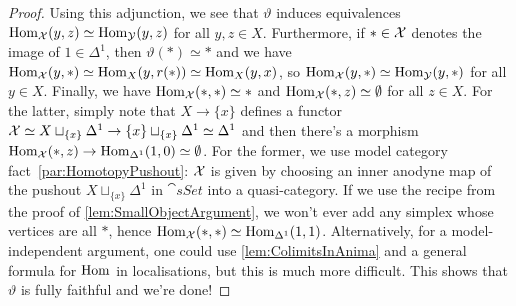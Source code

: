 \begin{proof}
	Using this adjunction, we see that $\vartheta$ induces equivalences $\operatorname{Hom}_{\mathcal{X}}(y,z)\simeq \operatorname{Hom}_{\mathcal{Y}}(y,z)$ for all $y,z\in X$. Furthermore, if $*\in \mathcal{X}$ denotes the image of $1\in \Delta^1$, then $\vartheta(*)\simeq *$ and we have $\operatorname{Hom}_{\mathcal{X}}(y,*)\simeq \operatorname{Hom}_X(y,r(*))\simeq \operatorname{Hom}_X(y,x)$, so $\operatorname{Hom}_{\mathcal{X}}(y,*)\simeq \operatorname{Hom}_{\mathcal{Y}}(y,*)$ for all $y\in X$. Finally, we have $\operatorname{Hom}_{\mathcal{X}}(*,*)\simeq *$ and $\operatorname{Hom}_{\mathcal{X}}(*,z)\simeq \emptyset$ for all $z\in X$. For the latter, simply note that $X\rightarrow\{x\}$ defines a functor $\mathcal{X}\simeq X\sqcup_{\{x\}}\Delta^1\rightarrow \{x\}\sqcup_{\{x\}}\Delta^1\simeq \Delta^1$ and then there's a morphism $\operatorname{Hom}_{\mathcal{X}}(*,z)\rightarrow \operatorname{Hom}_{\Delta^1}(1,0)\simeq \emptyset$. For the former, we use model category fact~\cref{par:HomotopyPushout}: $\mathcal{X}$ is given by choosing an inner anodyne map of the pushout $X\sqcup_{\{x\}}\Delta^1$ in $\cat{sSet}$ into a quasi-category. If we use the recipe from the proof of \cref{lem:SmallObjectArgument}, we won't ever add any simplex whose vertices are all $*$, hence $\operatorname{Hom}_{\mathcal{X}}(*,*)\simeq \operatorname{Hom}_{\Delta^1}(1,1)$. Alternatively, for a model-independent argument, one could use \cref{lem:ColimitsInAnima} and a general formula for $\operatorname{Hom}$ in localisations, but this is much more difficult. This shows that $\vartheta$ is fully faithful and we're done!
\end{proof}
